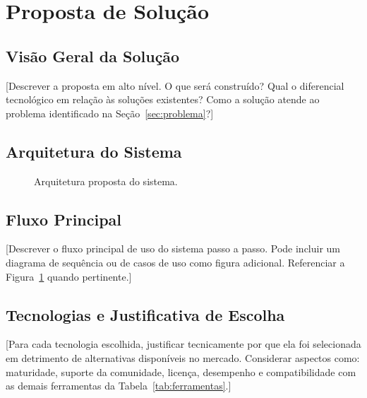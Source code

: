 \section{Proposta de Solução}
\label{sec:proposta}

\subsection{Visão Geral da Solução}
\label{sec:visao-geral}

[Descrever a proposta em alto nível.
O que será construído? Qual o diferencial tecnológico em relação às soluções existentes?
Como a solução atende ao problema identificado na Seção~\ref{sec:problema}?]

\subsection{Arquitetura do Sistema}
\label{sec:arquitetura}

\begin{figure}[h]
  \centering
  \caption{Arquitetura proposta do sistema.}
  \label{fig:arquitetura}
\end{figure}

\subsection{Fluxo Principal}
\label{sec:fluxo}

[Descrever o fluxo principal de uso do sistema passo a passo.
Pode incluir um diagrama de sequência ou de casos de uso como figura adicional.
Referenciar a Figura~\ref{fig:arquitetura} quando pertinente.]

\subsection{Tecnologias e Justificativa de Escolha}
\label{sec:justificativa-tec}

[Para cada tecnologia escolhida, justificar tecnicamente por que ela foi selecionada
em detrimento de alternativas disponíveis no mercado.
Considerar aspectos como: maturidade, suporte da comunidade, licença, desempenho e
compatibilidade com as demais ferramentas da Tabela~\ref{tab:ferramentas}.]
